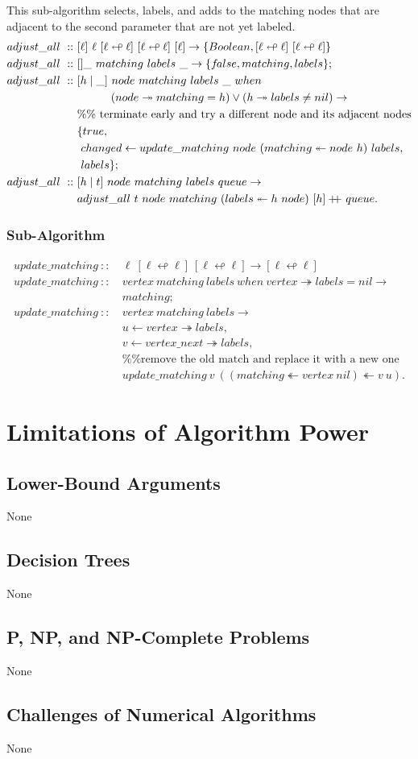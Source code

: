 \documentclass[a4paper,10pt]{book}
\newcommand\when{\  when\ }
\newcommand\doubleplus{+\kern-1.3ex+\kern0.8ex}
\newcommand{\false}{f\kern-0.25ex{alse}}
\begin{document}
This sub-algorithm selects, labels, and adds to the matching nodes that are adjacent to the second parameter that are not yet labeled.
\begin{align*}
adjust\_all\ ::\ &[\ell]\ \ell\ [\ell\looparrowleft\ell]\ [\ell\looparrowleft\ell]\ [\ell]\rightarrow\{Boolean,[\ell\looparrowleft\ell]\ [\ell\looparrowleft\ell]\}\\
adjust\_all\ ::\ &[]\_\ matching\ labels\ \_\rightarrow\{\false,matching,labels\};\\
adjust\_all\ ::\ &[h\mid \_]\ node\ matching\ labels\ \_\when\\
	&\qquad\quad(node\twoheadrightarrow matching = h)\lor (h\twoheadrightarrow labels\ne nil)\rightarrow\\
	&\%\%\text{ terminate early and try a different node and its adjacent nodes}\\
	&\{true,\\
	&\ changed\leftarrow update\_matching\ node\ (matching\twoheadleftarrow node\ h)\ labels,\\
	&\ labels\};\\
adjust\_all\ ::\ &[h\mid t]\ node\ matching\ labels\ queue\rightarrow\\
	&adjust\_all\ t\ node\ matching\ (labels\twoheadleftarrow h\ node)\ [h]\doubleplus queue.
\end{align*}

\subsection{Sub-Algorithm}
\begin{align*}
update\_matching\ ::\ &\ell\ [\ell\looparrowleft\ell]\ [\ell\looparrowleft\ell]\rightarrow [\ell\looparrowleft\ell]\\
update\_matching\ ::\ & vertex\ matching\ labels\when vertex\twoheadrightarrow labels=nil\rightarrow\\
	&matching;\\
update\_matching\ ::\ &vertex\ matching\ labels\rightarrow\\
	&u\leftarrow vertex\twoheadrightarrow labels,\\
	&v\leftarrow vertex\_next\twoheadrightarrow labels,\\
	&\%\%\text{remove the old match and replace it with a new one}\\
	&update\_matching\ v\ ((matching\twoheadleftarrow vertex\ nil)\twoheadleftarrow v\ u).
\end{align*}
\chapter{Limitations of Algorithm Power}
\section{Lower-Bound Arguments}
None
\section{Decision Trees}
None
\section{P, NP, and NP-Complete Problems}
None
\section{Challenges of Numerical Algorithms}
None
\end{document}
